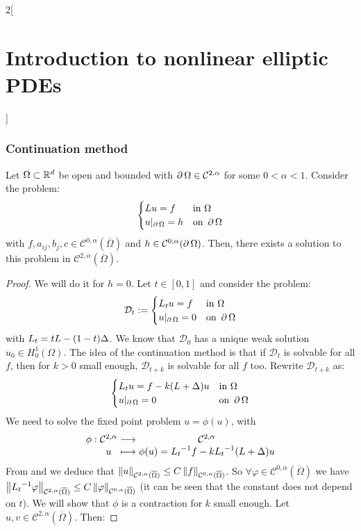 \documentclass[../../../main_math.tex]{subfiles}
\begin{document}
\begin{multicols}{2}[\section{Introduction to nonlinear elliptic PDEs}]
  \subsubsection{Continuation method}
  \begin{theorem}
    Let $\Omega\subset\mathbb{R}^d$ be open and bounded with $\operatorname{\partial}{\Omega}\in\mathcal{C}^{2,\alpha}$ for some $0<\alpha<1$. Consider the problem:
    $$
      \begin{cases}
        Lu=f               & \text{in }\Omega      \\
        u|_{\operatorname{\partial}{\Omega}}=h & \text{on }\operatorname{\partial}{\Omega}
      \end{cases}
    $$
    with $f,a_{ij},b_j,c\in\mathcal{C}^{0,\alpha}( \overline{\Omega})$ and $h\in\mathcal{C}^{0,\alpha}(\operatorname{\partial}{\Omega})$. Then, there exists a solution to this problem in $\mathcal{C}^{2,\alpha}(\overline{\Omega})$.
  \end{theorem}
  \begin{proof}
    We will do it for $h=0$.
    Let $t\in [0,1]$ and consider the problem:
    $$ \mathcal{D}_t:= \begin{cases}
        L_tu=f             & \text{in }\Omega      \\
        u|_{\operatorname{\partial}{\Omega}}=0 & \text{on }\operatorname{\partial}{\Omega}
      \end{cases}$$
    with $L_t=tL-(1-t)\Delta$. We know that $\mathcal{D}_0$ has a unique weak solution $u_0\in H_0^1(\Omega)$. The idea of the continuation method is that if $\mathcal{D}_t$ is solvable for all $f$, then for $k>0$ small enough, $\mathcal{D}_{t+k}$ is solvable for all $f$ too. Rewrite $\mathcal{D}_{t+k}$ as:
    $$
      \begin{cases}
        L_{t}u=f-k(L+\Delta)u & \text{in }\Omega      \\
        u|_{\operatorname{\partial}{\Omega}}=0        & \text{on }\operatorname{\partial}{\Omega}
      \end{cases}
    $$
    We need to solve the fixed point problem $u=\phi(u)$, with
    $$
      \function{\phi}{\mathcal{C}^{2,\alpha}}{\mathcal{C}^{2,\alpha}}{u}{\phi(u)={L_t}^{-1}f - k{L_t}^{-1}(L+\laplacian)u}
    $$
    From  and  we deduce that $\left\|u\right\|_{\mathcal{C}^{2,\alpha}(\overline{\Omega})}\leq C\left\|f\right\|_{\mathcal{C}^{0,\alpha}(\overline{\Omega})}$. So $\forall \varphi\in \mathcal{C}^{0,\alpha}(\overline{\Omega})$ we have $\left\|{L_t}^{-1}\varphi\right\|_{\mathcal{C}^{2,\alpha}(\overline{\Omega})}\leq C\left\|\varphi\right\|_{\mathcal{C}^{0,\alpha}(\overline{\Omega})}$ (it can be seen that the constant does not depend on $t$). We will show that $\phi$ is a contraction for $k$ small enough. Let $u,v\in \mathcal{C}^{2,\alpha}(\overline{\Omega})$. Then:

\end{proof}
\end{multicols}
\end{document}
